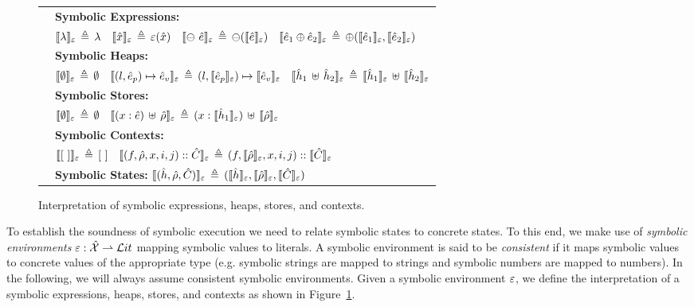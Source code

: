 \begin{figure}[ht!]
{
\begin{tabular}{l}
$\quad${\bf Symbolic Expressions:}  \\
$
\quad
\llbracket \lambda \rrbracket_{\varepsilon} \,\triangleq\, \lambda
\quad 
\llbracket \hat{x} \rrbracket_{\varepsilon} \,\triangleq\, \varepsilon(\hat{x})
\quad 
\llbracket \ominus\ \hat{e} \rrbracket_{\varepsilon} \,\triangleq\, \ominus (\llbracket \hat{e} \rrbracket_{\varepsilon})
\quad 
\llbracket \hat{e}_1 \oplus \hat{e}_2 \rrbracket_{\varepsilon} \,\triangleq\, \oplus(\llbracket \hat{e}_1 \rrbracket_{\varepsilon}, \llbracket \hat{e}_2 \rrbracket_{\varepsilon}) 
$
\\[3pt]
$\quad${\bf Symbolic Heaps:}  \\
$
\quad
 \llbracket \emptyset \rrbracket_{\varepsilon} \,\triangleq\, \emptyset
\quad
\llbracket (l, \hat{e}_p) \mapsto \hat{e}_v \rrbracket_{\varepsilon} \,\triangleq\,  (l, \llbracket \hat{e}_p \rrbracket_{\varepsilon}) \mapsto \llbracket \hat{e}_v \rrbracket_{\varepsilon}
\quad
\llbracket \hat{h}_1 \, \uplus \, \hat{h}_2 \rrbracket_{\varepsilon} \,\triangleq\,  \llbracket \hat{h}_1 \rrbracket_{\varepsilon} \, \uplus \, \llbracket \hat{h}_2 \rrbracket_{\varepsilon}
$%
\\[3pt]
$\quad${\bf Symbolic Stores:}  \\
$
\quad
 \llbracket \emptyset \rrbracket_{\varepsilon} \,\triangleq\, \emptyset
\quad 
 \llbracket (x: \hat{e}) \, \uplus \, \hat\rho \rrbracket_{\varepsilon} \,\triangleq\, (x: \llbracket \hat{h}_1 \rrbracket_{\varepsilon}) \, \uplus \, \llbracket \hat\rho \rrbracket_{\varepsilon}
$%
\\[3pt]
$\quad${\bf Symbolic Contexts:}  \\
$
\quad
 \llbracket [ \ ] \rrbracket_{\varepsilon} \,\triangleq\, [ \ ]
\quad 
 \llbracket (f, \hat\rho, x, i, j) :: \hat{C} \rrbracket_{\varepsilon} \,\triangleq\, (f, \llbracket \hat\rho \rrbracket_{\varepsilon}, x, i, j) :: \llbracket \hat{C} \rrbracket_{\varepsilon}
$%

\\[3pt]
$\quad${\bf Symbolic States:}  $\llbracket (\hat{h}, \hat\rho, \hat{C}) \rrbracket_{\varepsilon} \,\triangleq\, (\llbracket \hat{h} \rrbracket_{\varepsilon}, \llbracket \hat\rho \rrbracket_{\varepsilon}, \llbracket \hat{C} \rrbracket_{\varepsilon})$
\end{tabular}
}
\caption{Interpretation of symbolic expressions, heaps, stores, and contexts.\label{fig:symbolic:interp}}
\end{figure}

 To establish the soundness of symbolic execution we need to relate 
symbolic states to concrete states. To this end, we make use of \emph{symbolic environments} 
$\varepsilon : \hat{\mathcal{X}} \rightharpoonup \mathcal{L}it$ mapping symbolic values to \jsil literals. 
A symbolic environment is said to be \emph{consistent} if it maps symbolic 
values to concrete values of the appropriate type (e.g. symbolic strings are mapped to strings 
and symbolic numbers are mapped to numbers). In the following, we will always 
assume consistent symbolic environments. 
%
Given a symbolic environment $\varepsilon$, we define the interpretation of a symbolic 
expressions, heaps, stores, and contexts as shown in Figure~\ref{fig:symbolic:interp}. 

